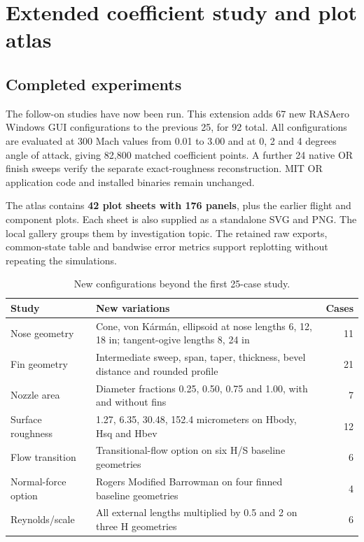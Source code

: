 \documentclass[oneside,openany]{amsdtx}
\begin{document}
\clearpage\section{Extended coefficient study and plot atlas}\label{sec:extended}
\subsection{Completed experiments}
The follow-on studies have now been run. This extension adds 67 new RASAero Windows GUI configurations to the previous 25, for 92 total. All configurations are evaluated at 300 Mach values from 0.01 to 3.00 and at 0, 2 and 4 degrees angle of attack, giving 82,800 matched coefficient points. A further 24 native OR finish sweeps verify the separate exact-roughness reconstruction. MIT OR application code and installed binaries remain unchanged.

The atlas contains \textbf{42 plot sheets with 176 panels}, plus the earlier flight and component plots. Each sheet is also supplied as a standalone SVG and PNG. The local gallery groups them by investigation topic. The retained raw exports, common-state table and bandwise error metrics support replotting without repeating the simulations.

\begin{table}[H]\centering\small\renewcommand{\arraystretch}{1.12}
\caption{New configurations beyond the first 25-case study.}\label{tab:extendedmatrix}
\begin{tabularx}{\textwidth}{@{}L{.26\textwidth}Xr@{}}\toprule
Study & New variations & Cases\\\midrule
Nose geometry & Cone, von K\'arm\'an, ellipsoid at nose lengths 6, 12, 18 in; tangent-ogive lengths 8, 24 in & 11\\
Fin geometry & Intermediate sweep, span, taper, thickness, bevel distance and rounded profile & 21\\
Nozzle area & Diameter fractions 0.25, 0.50, 0.75 and 1.00, with and without fins & 7\\
Surface roughness & 1.27, 6.35, 30.48, 152.4 micrometers on Hbody, Hsq and Hbev & 12\\
Flow transition & Transitional-flow option on six H/S baseline geometries & 6\\
Normal-force option & Rogers Modified Barrowman on four finned baseline geometries & 4\\
Reynolds/scale & All external lengths multiplied by 0.5 and 2 on three H geometries & 6\\\bottomrule
\end{tabularx}\end{table}
\end{document}
